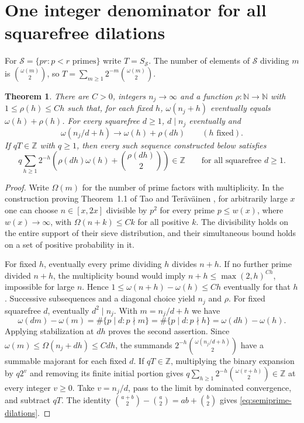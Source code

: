 \documentclass[11pt,letterpaper]{article}
\newtheorem{theorem}{Theorem}[section]
\newcommand{\Z}{\mathbb Z}
\newcommand{\N}{\mathbb N}
\begin{document}
\section{One integer denominator for all squarefree dilations}
For $\mathcal S=\{pr:p<r\text{ primes}\}$ write $T=S_{\mathcal S}$.
The number of elements of $\mathcal S$ dividing $m$ is
$\binom{\omega(m)}2$, so $T=\sum_{m\ge1}2^{-m}\binom{\omega(m)}2$.
\begin{theorem}\label{thm:semiprime-dilations}
There are $C>0$, integers $n_j\to\infty$ and a function $\rho:\N\to\N$ with
$1\le\rho(h)\le Ch$ such that, for each fixed $h$, $\omega(n_j+h)$ eventually equals
$\omega(h)+\rho(h)$. For every squarefree $d\ge1$, $d\mid n_j$ eventually and
\[
 \omega(n_j/d+h)\longrightarrow\omega(h)+\rho(dh)\qquad(h\text{ fixed}).
\]
If $qT\in\Z$ with $q\ge1$, then every such sequence constructed below satisfies
\begin{equation}\label{eq:semiprime-dilations}
 q\sum_{h\ge1}2^{-h}\left(\rho(dh)\omega(h)+\binom{\rho(dh)}2\right)\in\Z
 \qquad\text{for all squarefree }d\ge1 .
\end{equation}
\end{theorem}
\begin{proof}
Write $\Omega(m)$ for the number of prime factors with multiplicity. In the construction proving Theorem~1.1 of Tao and Ter\"av\"ainen \cite[Section~2, in particular axiom (i)]{tt}, for arbitrarily large $x$ one can choose $n\in[x,2x]$ divisible by $p^2$ for every prime $p\le w(x)$, where $w(x)\to\infty$, with $\Omega(n+k)\le Ck$ for all positive $k$.
The divisibility holds on the entire support of their sieve distribution, and their simultaneous bound holds on a set of positive probability in it.

For fixed $h$, eventually every prime dividing $h$ divides $n+h$. If no further prime divided $n+h$, the multiplicity bound would imply $n+h\le\max(2,h)^{Ch}$, impossible for large $n$. Hence $1\le\omega(n+h)-\omega(h)\le Ch$ eventually for that $h$. Successive subsequences and a diagonal choice yield $n_j$ and $\rho$. For fixed squarefree $d$, eventually $d^2\mid n_j$. With $m=n_j/d+h$ we have
\[
 \omega(dm)-\omega(m)=\#\{p\mid d:p\nmid m\}
 =\#\{p\mid d:p\nmid h\}=\omega(dh)-\omega(h).
\]
Applying stabilization at $dh$ proves the second assertion. Since
$\omega(m)\le\Omega(n_j+dh)\le Cdh$, the summands
$2^{-h}\binom{\omega(n_j/d+h)}2$ have a summable majorant for each fixed $d$. If $qT\in\Z$, multiplying the binary expansion by $q2^v$ and removing its finite initial portion gives
$q\sum_{h\ge1}2^{-h}\binom{\omega(v+h)}2\in\Z$ at every integer $v\ge0$.
Take $v=n_j/d$, pass to the limit by dominated convergence, and subtract $qT$. The identity $\binom{a+b}2-\binom a2=ab+\binom b2$ gives \eqref{eq:semiprime-dilations}.
\end{proof}
\end{document}
